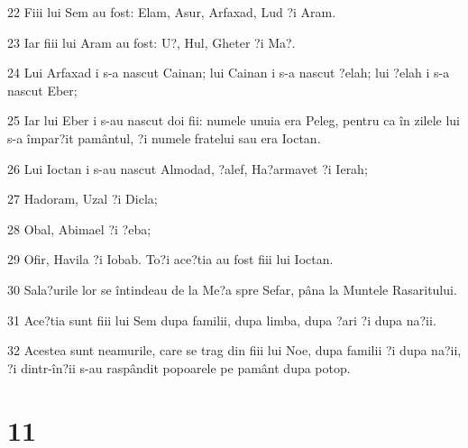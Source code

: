 \par 22 Fiii lui Sem au fost: Elam, Asur, Arfaxad, Lud ?i Aram.
\par 23 Iar fiii lui Aram au fost: U?, Hul, Gheter ?i Ma?.
\par 24 Lui Arfaxad i s-a nascut Cainan; lui Cainan i s-a nascut ?elah; lui ?elah i s-a nascut Eber;
\par 25 Iar lui Eber i s-au nascut doi fii: numele unuia era Peleg, pentru ca în zilele lui s-a împar?it pamântul, ?i numele fratelui sau era Ioctan.
\par 26 Lui Ioctan i s-au nascut Almodad, ?alef, Ha?armavet ?i Ierah;
\par 27 Hadoram, Uzal ?i Dicla;
\par 28 Obal, Abimael ?i ?eba;
\par 29 Ofir, Havila ?i Iobab. To?i ace?tia au fost fiii lui Ioctan.
\par 30 Sala?urile lor se întindeau de la Me?a spre Sefar, pâna la Muntele Rasaritului.
\par 31 Ace?tia sunt fiii lui Sem dupa familii, dupa limba, dupa ?ari ?i dupa na?ii.
\par 32 Acestea sunt neamurile, care se trag din fiii lui Noe, dupa familii ?i dupa na?ii, ?i dintr-în?ii s-au raspândit popoarele pe pamânt dupa potop.

\chapter{11}

